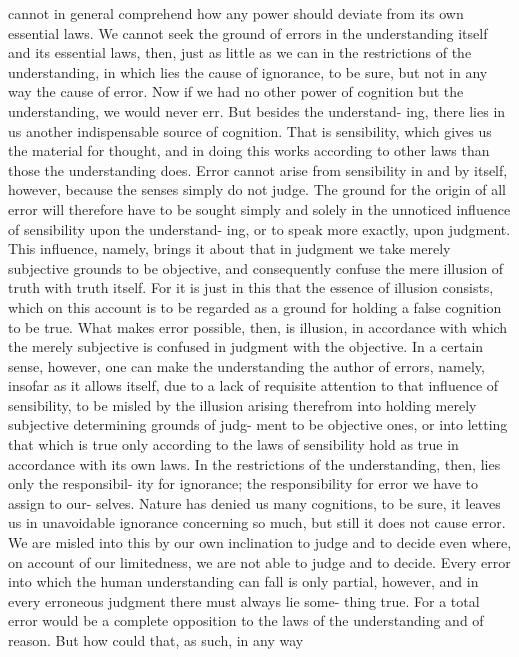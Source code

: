 cannot in general comprehend how any power should deviate from its own
essential laws. We cannot seek the ground of errors in the understanding
itself and its essential laws, then, just as little as we can in the restrictions of
the understanding, in which lies the cause of ignorance, to be sure, but not
in any way the cause of error. Now if we had no other power of cognition
but the understanding, we would never err. But besides the understand-
ing, there lies in us another indispensable source of cognition. That is
sensibility, which gives us the material for thought, and in doing this works
according to other laws than those the understanding does. Error cannot
arise from sensibility in and by itself, however, because the senses simply
do not judge.
The ground for the origin of all error will therefore have to be sought
simply and solely in the unnoticed influence of sensibility upon the understand-
ing, or to speak more exactly, upon judgment. This influence, namely,
brings it about that in judgment we take merely subjective grounds to be
objective, and consequently confuse the mere illusion of truth with truth itself.
For it is just in this that the essence of illusion consists, which on this
account is to be regarded as a ground for holding a false cognition to be
true.
What makes error possible, then, is illusion, in accordance with which
the merely subjective is confused in judgment with the objective.
In a certain sense, however, one can make the understanding the author
of errors, namely, insofar as it allows itself, due to a lack of requisite
attention to that influence of sensibility, to be misled by the illusion arising
therefrom into holding merely subjective determining grounds of judg-
ment to be objective ones, or into letting that which is true only according
to the laws of sensibility hold as true in accordance with its own laws.
In the restrictions of the understanding, then, lies only the responsibil-
ity for ignorance; the responsibility for error we have to assign to our-
selves. Nature has denied us many cognitions, to be sure, it leaves us in
unavoidable ignorance concerning so much, but still it does not cause
error. We are misled into this by our own inclination to judge and to
decide even where, on account of our limitedness, we are not able to
judge and to decide.
Every error into which the human understanding can fall is only partial,
however, and in every erroneous judgment there must always lie some-
thing true. For a total error would be a complete opposition to the laws of
the understanding and of reason. But how could that, as such, in any way
